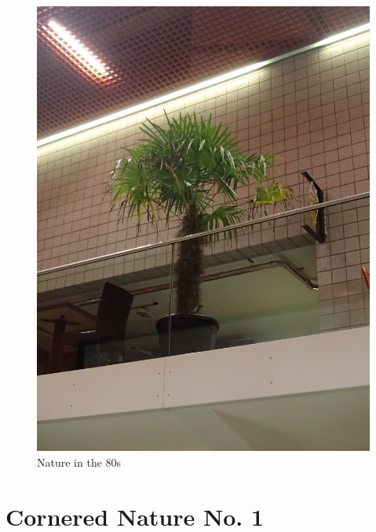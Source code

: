 \documentclass{article}
\begin{document}
\begin{figure}
\centering
\includegraphics[width=\textwidth,angle=-90]{figures/P1050152.JPG}
\caption{Nature in the 80s}
\end{figure}

\chapter{Cornered Nature No. 1}
\end{document}
